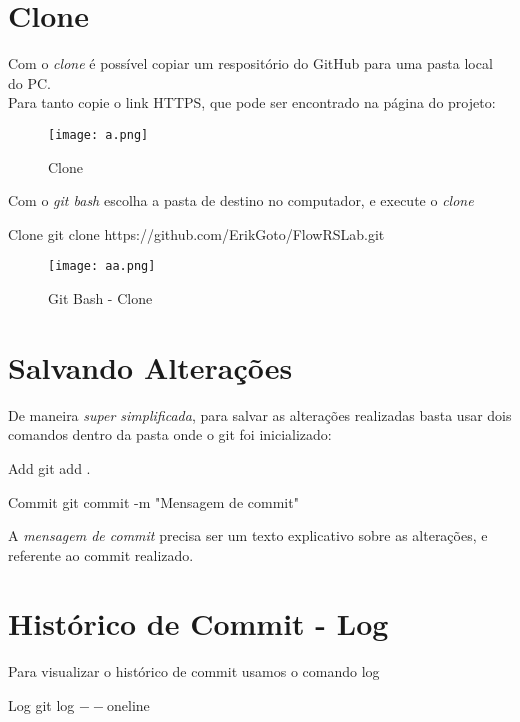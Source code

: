 \documentclass[aspectratio=169]{beamer}
\begin{document}
\section{Clone}
\begin{frame}{\insertsectionhead}
	Com o \textit{clone} é possível copiar um respositório do GitHub para uma pasta local do PC.\\
	Para tanto copie o link HTTPS, que pode ser encontrado na página do projeto:
	\begin{figure}
		\centering
		\texttt{[image: a.png]}
		\caption{Clone}
	\end{figure}
	
\end{frame}
\begin{frame}
	Com o \textit{git bash} escolha a pasta de destino no computador, e execute o \textit{clone}
	\begin{block}{Clone}
		git clone https://github.com/ErikGoto/FlowRSLab.git
	\end{block}
	\begin{figure}
		\centering
		\texttt{[image: aa.png]}
		\caption{Git Bash - Clone}
	\end{figure}
\end{frame}

\section{Salvando Alterações}
\begin{frame}{\insertsectionhead}
	De maneira \textit{super simplificada}, para salvar as alterações realizadas basta usar dois comandos dentro da pasta onde o git foi inicializado:
	\begin{block}{Add}
		git add .
	\end{block}
	\begin{block}{Commit}
		git commit -m "Mensagem de commit"
	\end{block}
	A \textit{mensagem de commit} precisa ser um texto explicativo sobre as alterações, e referente ao commit realizado. 
	
\end{frame}

\section{Histórico de Commit - Log}
\begin{frame}{\insertsectionhead}
	Para visualizar o histórico de commit usamos o comando log
	\begin{block}{Log}
		git log $--$oneline
	\end{block}
	
\end{frame}
\end{document}
